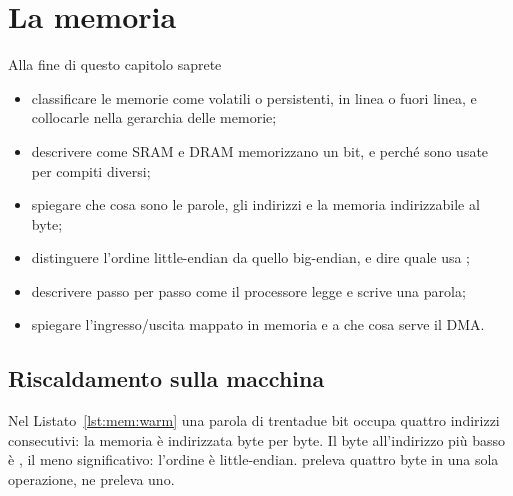 \chapter{La memoria}
\label{ch:memory}


\begin{chapgoals}
Alla fine di questo capitolo saprete
\begin{itemize}
\item classificare le memorie come volatili o persistenti, in linea o fuori linea, e collocarle nella gerarchia delle memorie;
\item descrivere come SRAM e DRAM memorizzano un bit, e perché sono usate per compiti diversi;
\item spiegare che cosa sono le parole, gli indirizzi e la memoria indirizzabile al byte;
\item distinguere l'ordine little-endian da quello big-endian, e dire quale usa \riscv;
\item descrivere passo per passo come il processore legge e scrive una parola;
\item spiegare l'ingresso/uscita mappato in memoria e a che cosa serve il DMA.
\end{itemize}
\end{chapgoals}


\section{Riscaldamento sulla macchina}


Nel Listato~\ref{lst:mem:warm} una parola di trentadue bit occupa quattro
indirizzi consecutivi: la memoria è indirizzata byte per byte. Il byte
all'indirizzo più basso è , il meno significativo: l'ordine è
little-endian.  preleva quattro byte in una sola operazione, 
ne preleva uno.


